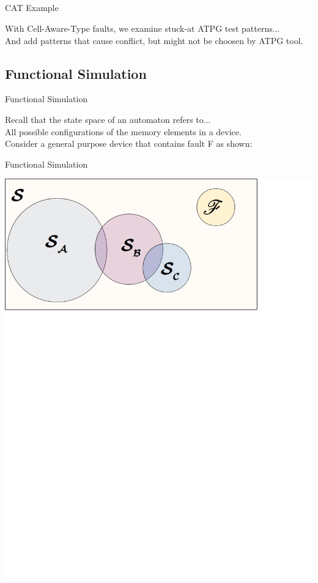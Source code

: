 \documentclass{beamer}
\begin{document}
\subsection{}
\begin{frame}{CAT Example}
\begin{center}
With Cell-Aware-Type faults, we examine stuck-at ATPG test patterns... \\
\pause And add patterns that cause conflict, but might not be choosen by ATPG tool.
\end{center}
\end{frame}



\subsection{Functional Simulation}
\begin{frame}{Functional Simulation}
\begin{center}
Recall that the state space of an automaton refers to...
\\\pause All possible configurations of the memory elements in a device. \\ \pause Consider a general purpose device that contains fault F as shown: 
\end{center}
\end{frame}

\begin{frame}{Functional Simulation}
\begin{center}
\includegraphics[scale=0.55]{Images/sd1.png}
\end{center}
\end{frame}
\end{document}
